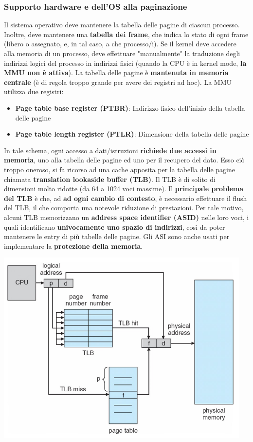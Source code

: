 \documentclass[12pt]{article}
\begin{document}
\subsubsection{Supporto hardware e dell'OS alla paginazione}
Il sistema operativo deve mantenere la tabella delle pagine di ciascun processo.
Inoltre, deve mantenere una \textbf{tabella dei frame}, che indica lo stato di ogni frame (libero o assegnato, e, in tal caso, a che processo/i).
Se il kernel deve accedere alla memoria di un processo, deve effettuare "manualmente" la traduzione degli indirizzi logici del processo in indirizzi fisici (quando la CPU è in kernel mode, \textbf{la MMU non è attiva}).
La tabella delle pagine è \textbf{mantenuta in memoria centrale} (è di regola troppo grande per avere dei registri ad hoc).
La MMU utilizza due registri:
\begin{itemize}
    \item \textbf{Page table base register (PTBR)}: Indirizzo fisico dell'inizio della tabella delle pagine
    \item \textbf{Page table length register (PTLR)}: Dimensione della tabella delle pagine
\end{itemize}
In tale schema, ogni accesso a dati/istruzioni \textbf{richiede due accessi in memoria}, uno alla tabella delle pagine ed uno per il recupero del dato.
Esso ciò troppo oneroso, si fa ricorso ad una cache apposita per la tabella delle pagine chiamata \textbf{translation lookaside buffer (TLB)}.
Il TLB è di solito di dimensioni molto ridotte (da 64 a 1024 voci massime).
Il \textbf{principale problema del TLB} è che, ad \textbf{ad ogni cambio di contesto}, è necessario effettuare il flush del TLB, il che comporta una notevole riduzione di prestazioni.
Per tale motivo, alcuni TLB memorizzano un \textbf{address space identifier (ASID)} nelle loro voci, i quali identificano \textbf{univocamente uno spazio di indirizzi}, così da poter mantenere le entry di più tabelle delle pagine.
Gli ASI sono anche usati per implementare la \textbf{protezione della memoria}.
\begin{center}
    \includegraphics[width = 0.70\linewidth]{Images/61.png}
\end{center}
\end{document}
